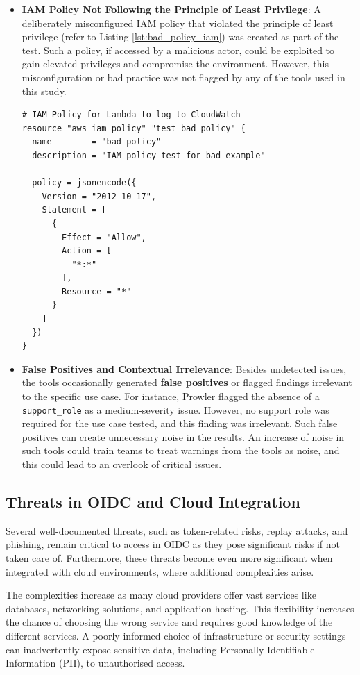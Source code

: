 \begin{itemize}
    \item \textbf{IAM Policy Not Following the Principle of Least Privilege}: 
    A deliberately misconfigured IAM policy that violated the principle of least privilege (refer to Listing \ref{lst:bad_policy_iam}) was created as part of the test. Such a policy, if accessed by a malicious actor, could be exploited to gain elevated privileges and compromise the environment. However, this misconfiguration or bad practice was not flagged by any of the tools used in this study.

    \begin{lstlisting}[caption={Added a Bad IAM Policy that allows all actions}, label={lst:bad_policy_iam}]
# IAM Policy for Lambda to log to CloudWatch
resource "aws_iam_policy" "test_bad_policy" {
  name        = "bad policy"
  description = "IAM policy test for bad example"

  policy = jsonencode({
    Version = "2012-10-17",
    Statement = [
      {
        Effect = "Allow",
        Action = [
          "*:*"
        ],
        Resource = "*"
      }
    ]
  })
}
\end{lstlisting} 

\item \textbf{False Positives and Contextual Irrelevance}: Besides undetected issues, the tools occasionally generated \textbf{false positives} or flagged findings irrelevant to the specific use case. For instance, Prowler flagged the absence of a \texttt{support\_role} as a medium-severity issue. However, no support role was required for the use case tested, and this finding was irrelevant. Such false positives can create unnecessary noise in the results. An increase of noise in such tools could train teams to treat warnings from the tools as noise, and this could lead to an overlook of critical issues.
\end{itemize}

\subsection{Threats in OIDC and Cloud Integration}
Several well-documented threats, such as token-related risks, replay attacks, and phishing, remain critical to access in OIDC as they pose significant risks if not taken care of. Furthermore, these threats become even more significant when integrated with cloud environments, where additional complexities arise.

The complexities increase as many cloud providers offer vast services like databases, networking solutions, and application hosting. This flexibility increases the chance of choosing the wrong service and requires good knowledge of the different services. A poorly informed choice of infrastructure or security settings can inadvertently expose sensitive data, including Personally Identifiable Information (PII), to unauthorised access.

